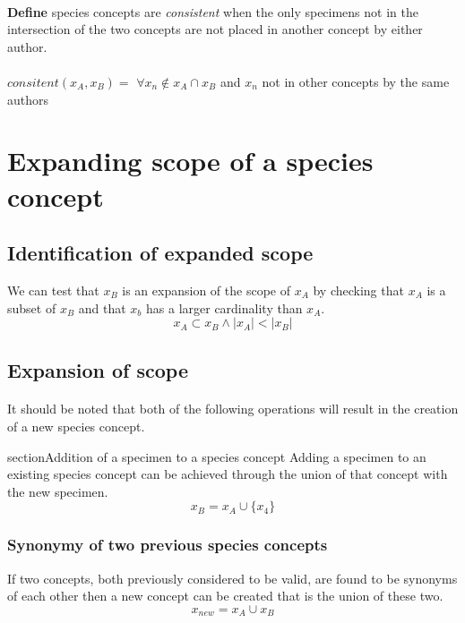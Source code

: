 \documentclass{article}
\begin{document}
   \paragraph{}
   \textbf{Define}  species concepts are \textit{consistent} when the only specimens not in the intersection of the two concepts are not placed in another concept by either author.
   \paragraph{}
   $consitent(x_A,x_B) =$ $\forall x_n \notin x_A \cap x_B$  and $x_n$ not in other concepts by the same authors
   
   \section{Expanding scope of a species concept}
   \subsection{Identification of expanded scope}
   We can test that $x_B$ is an expansion of the scope of $x_A$ by checking that $x_A$ is a subset of $x_B$ and that $x_b$ has a larger cardinality than $x_A$.
   \[x_A \subset x_B \land \left|x_A\right| < \left|x_B\right|\]
   
   \subsection{Expansion of scope}
   \paragraph{}
   It should be noted that both of the following operations will result in the creation of a new species concept.
   
   
   section{Addition of a specimen to a species concept}
   Adding a specimen to an existing species concept can be achieved through the union of that concept with the new specimen.
   \[x_B = x_A \cup \{x_4\}\]
   
   \subsubsection{Synonymy of two previous species concepts}
   If two concepts, both previously considered to be valid, are found to be synonyms of each other then a new concept can be created that is the union of these two.
   \[x_{new}=x_A \cup x_B\]
   
\end{document}
